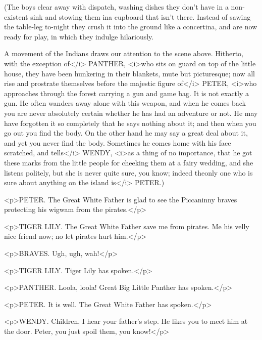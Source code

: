 \begin{stagedir}
(The boys clear away with dispatch, washing dishes they don't have in a non-existent sink and stowing them ina cupboard that isn't there. Instead of sawing the table-leg to-night they crush it into the ground like a concertina, and are now ready for play, in which they indulge hilariously.

A movement of the Indians draws our attention to the scene above. Hitherto, with the exception of</i> PANTHER, <i>who sits on guard on top of the little house, they have been hunkering in their blankets, mute but picturesque; now all rise and prostrate themselves before the majestic figure of</i> PETER, <i>who approaches through the forest carrying a gun and game bag. It is not exactly a gun. He often wanders away alone with this weapon, and when he comes back you are never absolutely certain whether he has had an adventure or not. He may have forgotten it so completely that he says nothing about it; and then when you go out you find the body. On the other hand he may say a great deal about it, and yet you never find the body. Sometimes he comes home with his face scratched, and tells</i> WENDY, <i>as a thing of no importance, that he got these marks from the little people for cheeking them at a fairy wedding, and she listens politely, but she is never quite sure, you know; indeed theonly one who is sure about anything on the island is</i> PETER.)
\end{stagedir}

<p>PETER. The Great White Father is glad to see the Piccaninny braves protecting his wigwam from the pirates.</p>

<p>TIGER LILY. The Great White Father save me from pirates. Me his velly nice friend now; no let pirates hurt him.</p>

<p>BRAVES. Ugh, ugh, wah!</p>

<p>TIGER LILY. Tiger Lily has spoken.</p>

<p>PANTHER. Loola, loola! Great Big Little Panther has spoken.</p>

<p>PETER. It is well. The Great White Father has spoken.</p>


<p>WENDY. Children, I hear your father's step. He likes you to meet him at the door.
Peter, you just spoil them, you know!</p>


